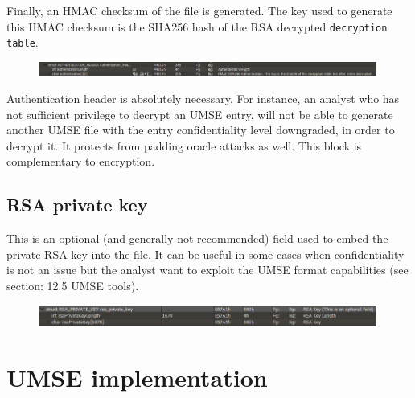 Finally, an HMAC checksum of the file is generated. The key used to generate
this HMAC checksum is the SHA256 hash of the RSA decrypted \texttt{decryption
  table}.
\begin{figure}[h]
  \centering
  \includegraphics[width=0.99\textwidth]{./figures/UMSEAH}
\end{figure}

Authentication header is absolutely necessary. For instance, an analyst who
has not sufficient privilege to decrypt an UMSE entry, will not be able to
generate another UMSE file with the entry confidentiality level downgraded, in
order to decrypt it.  It protects from padding oracle attacks\cite{Eurocrypt2002}\cite{Oaep} as well. This
block is complementary to encryption.

\subsection{RSA private key}

This is an optional (and generally not recommended) field used to embed the
private RSA key into the file. It can be useful in some cases when
confidentiality is not an issue but the analyst want to exploit the UMSE
format capabilities (see section: 12.5 UMSE tools).
\begin{figure}[h]
  \centering
  \includegraphics[width=0.99\textwidth]{./figures/UMSEPK}
\end{figure}

\section{UMSE implementation}

